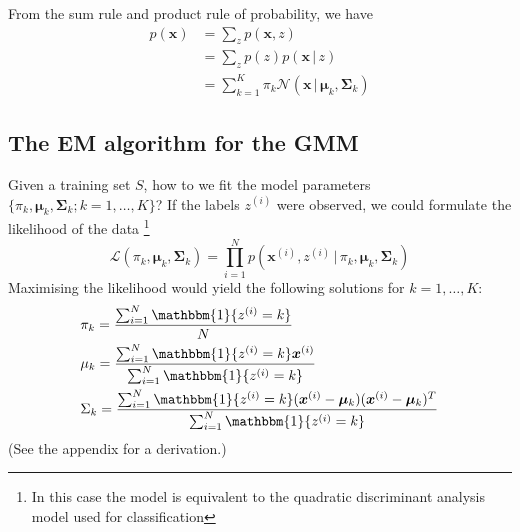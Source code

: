 \documentclass[final,3p,times,twocolumn]{elsarticle}
\begin{document}
From the sum rule and product rule of probability, we have
\begin{equation}
\begin{split}
p(\boldsymbol x) &= \sum_z p(\boldsymbol x, z) \\
&= \sum_z p(z)p(\boldsymbol x \,|\, z)\\
&= \sum_{k=1}^K \pi_k \mathcal{N}(\boldsymbol x\,|\,\boldsymbol \mu_k, \boldsymbol \Sigma_k)
\label{eqn:gmmdensity}
\end{split}
\end{equation}

\subsection{The EM algorithm for the GMM}
Given a training set $S$, how to we fit the model parameters $\{\pi_k, \boldsymbol \mu_k, \boldsymbol \Sigma_k; k=1,\dots,K\}$?
	If the labels $z^{(i)}$ were observed, we could formulate the likelihood of the data \footnote{In this case the model is equivalent to the quadratic discriminant analysis model used for classification} 
\begin{equation}
\mathcal{L}(\pi_k, \boldsymbol \mu_k, \boldsymbol \Sigma_k) = \prod_{i=1}^N p(\boldsymbol x^{(i)},z^{(i)}\,|\,\pi_k, \boldsymbol \mu_k, \boldsymbol \Sigma_k)
\label{eqn:LDAlikelihood}
\end{equation}
Maximising the likelihood would yield the following solutions for $k = 1,\dots,K$:
\begin{equation}
\begin{split}
\label{eqn:LDAstats}
&\pi_k = \frac{\sum_{i=1}^N \mathbbm{1}\{z^{(i)} = k\}}{N}\\
&\mu_k = \frac{\sum_{i=1}^N \mathbbm{1}\{z^{(i)} = k\} \boldsymbol{x}^{(i)}}{\sum_{i=1}^N \mathbbm{1}\{z^{(i)} = k\}}\\
&\Sigma_k = \frac{\sum_{i=1}^N \mathbbm{1}\{z^{(i)} = k\} (\boldsymbol{x}^{(i)} - \boldsymbol \mu_k)(\boldsymbol{x}^{(i)} - \boldsymbol \mu_k)^T}{\sum_{i=1}^N \mathbbm{1}\{z^{(i)} = k\}}\\
\end{split}
\end{equation}
(See the appendix for a derivation.)
\end{document}
